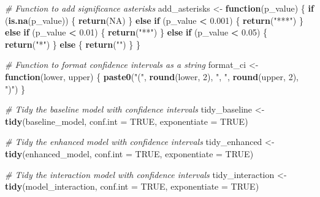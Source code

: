 \documentclass[
]{article}
\newenvironment{Shaded}{\begin{snugshade}}{\end{snugshade}}
\newcommand{\AttributeTok}[1]{\textcolor[rgb]{0.13,0.29,0.53}{#1}}
\newcommand{\CommentTok}[1]{\textcolor[rgb]{0.56,0.35,0.01}{\textit{#1}}}
\newcommand{\ConstantTok}[1]{\textcolor[rgb]{0.56,0.35,0.01}{#1}}
\newcommand{\ControlFlowTok}[1]{\textcolor[rgb]{0.13,0.29,0.53}{\textbf{#1}}}
\newcommand{\DecValTok}[1]{\textcolor[rgb]{0.00,0.00,0.81}{#1}}
\newcommand{\FloatTok}[1]{\textcolor[rgb]{0.00,0.00,0.81}{#1}}
\newcommand{\FunctionTok}[1]{\textcolor[rgb]{0.13,0.29,0.53}{\textbf{#1}}}
\newcommand{\NormalTok}[1]{#1}
\newcommand{\OtherTok}[1]{\textcolor[rgb]{0.56,0.35,0.01}{#1}}
\newcommand{\SpecialCharTok}[1]{\textcolor[rgb]{0.81,0.36,0.00}{\textbf{#1}}}
\newcommand{\StringTok}[1]{\textcolor[rgb]{0.31,0.60,0.02}{#1}}
\begin{document}
\begin{Shaded}
\begin{Highlighting}[]
\CommentTok{\# Function to add significance asterisks}
\NormalTok{add\_asterisks }\OtherTok{\textless{}{-}} \ControlFlowTok{function}\NormalTok{(p\_value) \{}
  \ControlFlowTok{if}\NormalTok{ (}\FunctionTok{is.na}\NormalTok{(p\_value)) \{}
    \FunctionTok{return}\NormalTok{(}\ConstantTok{NA}\NormalTok{)}
\NormalTok{  \} }\ControlFlowTok{else} \ControlFlowTok{if}\NormalTok{ (p\_value }\SpecialCharTok{\textless{}} \FloatTok{0.001}\NormalTok{) \{}
    \FunctionTok{return}\NormalTok{(}\StringTok{"***"}\NormalTok{)}
\NormalTok{  \} }\ControlFlowTok{else} \ControlFlowTok{if}\NormalTok{ (p\_value }\SpecialCharTok{\textless{}} \FloatTok{0.01}\NormalTok{) \{}
    \FunctionTok{return}\NormalTok{(}\StringTok{"**"}\NormalTok{)}
\NormalTok{  \} }\ControlFlowTok{else} \ControlFlowTok{if}\NormalTok{ (p\_value }\SpecialCharTok{\textless{}} \FloatTok{0.05}\NormalTok{) \{}
    \FunctionTok{return}\NormalTok{(}\StringTok{"*"}\NormalTok{)}
\NormalTok{  \} }\ControlFlowTok{else}\NormalTok{ \{}
    \FunctionTok{return}\NormalTok{(}\StringTok{""}\NormalTok{)}
\NormalTok{  \}}
\NormalTok{\}}
\end{Highlighting}
\end{Shaded}

\begin{Shaded}
\begin{Highlighting}[]
\CommentTok{\# Function to format confidence intervals as a string}
\NormalTok{format\_ci }\OtherTok{\textless{}{-}} \ControlFlowTok{function}\NormalTok{(lower, upper) \{}
  \FunctionTok{paste0}\NormalTok{(}\StringTok{"("}\NormalTok{, }\FunctionTok{round}\NormalTok{(lower, }\DecValTok{2}\NormalTok{), }\StringTok{", "}\NormalTok{, }\FunctionTok{round}\NormalTok{(upper, }\DecValTok{2}\NormalTok{), }\StringTok{")"}\NormalTok{)}
\NormalTok{\}}
\end{Highlighting}
\end{Shaded}

\begin{Shaded}
\begin{Highlighting}[]
\CommentTok{\# Tidy the baseline model with confidence intervals}
\NormalTok{tidy\_baseline }\OtherTok{\textless{}{-}} \FunctionTok{tidy}\NormalTok{(baseline\_model, }\AttributeTok{conf.int =} \ConstantTok{TRUE}\NormalTok{, }\AttributeTok{exponentiate =} \ConstantTok{TRUE}\NormalTok{)}

\CommentTok{\# Tidy the enhanced model with confidence intervals}
\NormalTok{tidy\_enhanced }\OtherTok{\textless{}{-}} \FunctionTok{tidy}\NormalTok{(enhanced\_model, }\AttributeTok{conf.int =} \ConstantTok{TRUE}\NormalTok{, }\AttributeTok{exponentiate =} \ConstantTok{TRUE}\NormalTok{)}

\CommentTok{\# Tidy the interaction model with confidence intervals}
\NormalTok{tidy\_interaction }\OtherTok{\textless{}{-}} \FunctionTok{tidy}\NormalTok{(model\_interaction, }\AttributeTok{conf.int =} \ConstantTok{TRUE}\NormalTok{, }\AttributeTok{exponentiate =} \ConstantTok{TRUE}\NormalTok{)}
\end{Highlighting}
\end{Shaded}
\end{document}
